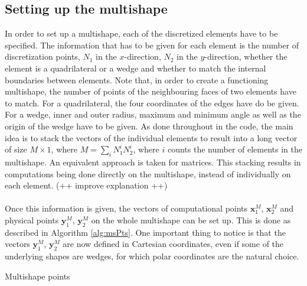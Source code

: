 \documentclass[11pt, a4paper]{article}
\theoremstyle{definition}
\begin{document}
\subsection{Setting up the multishape}
In order to set up a multishape, each of the discretized elements have to be specified. The information that has to be given for each element is the number of discretization points, $N_1$ in the $x$-direction, $N_2$ in the $y$-direction, whether the element is a quadrilateral or a wedge and whether to match the internal boundaries between elements. Note that, in order to create a functioning multishape, the number of points of the neighbouring faces of two elements have to match. For a quadrilateral, the four coordinates of the edges have do be given. For a wedge, inner and outer radius, maximum and minimum angle as well as the origin of the wedge have to be given. 
As done throughout in the code, the main idea is to stack the vectors of the individual elements to result into a long vector of size $M \times 1$, where $M = \sum_i N^i_1 N^i_2$, where $i$ counts the number of elements in the multishape. An equivalent approach is taken for matrices. This stacking results in computations being done directly on the multishape, instead of individually on each element. (++ improve explanation ++)
\\
\\
Once this information is given, the vectors of computational points $\mathbf x_1^M$, $\mathbf x_2^M$ and physical points $\mathbf y_1^M$, $\mathbf y_2^M$ on the whole multishape can be set up. This is done as described in Algorithm \ref{alg:msPts}.
 One important thing to notice is that the vectors $\mathbf y_1^M$, $\mathbf y_2^M$ are now defined in Cartesian coordinates, even if some of the underlying shapes are wedges, for which polar coordinates are the natural choice.
 \\

\begin{algorithm}[H]	\label{alg:msPts}
	\SetAlgoLined
\caption{Multishape points}
\end{algorithm}
\end{document}

